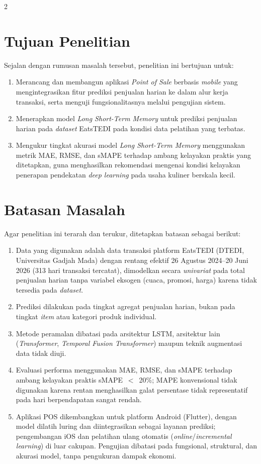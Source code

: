 \documentclass[12pt, a4paper, onecolumn, oneside]{report}
\begin{document}
\begin{spacing}{2}
\section{Tujuan Penelitian}
Sejalan dengan rumusan masalah tersebut, penelitian ini bertujuan untuk:
\begin{enumerate}
    \item Merancang dan membangun aplikasi \textit{Point of Sale} berbasis \textit{mobile} yang mengintegrasikan fitur prediksi penjualan harian ke dalam alur kerja transaksi, serta menguji fungsionalitasnya melalui pengujian sistem.
    \item Menerapkan model \textit{Long Short-Term Memory} untuk prediksi penjualan harian pada \textit{dataset} EatsTEDI pada kondisi data pelatihan yang terbatas.
    \item Mengukur tingkat akurasi model \textit{Long Short-Term Memory} menggunakan metrik MAE, RMSE, dan sMAPE terhadap ambang kelayakan praktis yang ditetapkan, guna menghasilkan rekomendasi mengenai kondisi kelayakan penerapan pendekatan \textit{deep learning} pada usaha kuliner berskala kecil.
\end{enumerate}

\section{Batasan Masalah}
Agar penelitian ini terarah dan terukur, ditetapkan batasan sebagai berikut:
\begin{enumerate}
    \item Data yang digunakan adalah data transaksi platform EatsTEDI (DTEDI, Universitas Gadjah Mada) dengan rentang efektif 26 Agustus 2024--20 Juni 2026 (313 hari transaksi tercatat), dimodelkan secara \textit{univariat} pada total penjualan harian tanpa variabel eksogen (cuaca, promosi, harga) karena tidak tersedia pada \textit{dataset}.
    \item Prediksi dilakukan pada tingkat agregat penjualan harian, bukan pada tingkat \textit{item} atau kategori produk individual.
    \item Metode peramalan dibatasi pada arsitektur LSTM, arsitektur lain (\textit{Transformer}, \textit{Temporal Fusion Transformer}) maupun teknik augmentasi data tidak diuji.
    \item Evaluasi performa menggunakan MAE, RMSE, dan sMAPE terhadap ambang kelayakan praktis sMAPE~$<$~20\%; MAPE konvensional tidak digunakan karena rentan menghasilkan galat persentase tidak representatif pada hari berpendapatan sangat rendah.
    \item Aplikasi POS dikembangkan untuk platform Android (Flutter), dengan model dilatih luring dan diintegrasikan sebagai layanan prediksi; pengembangan iOS dan pelatihan ulang otomatis (\textit{online}/\textit{incremental learning}) di luar cakupan. Pengujian dibatasi pada fungsional, struktural, dan akurasi model, tanpa pengukuran dampak ekonomi.
\end{enumerate}


\end{spacing}
\end{document}
